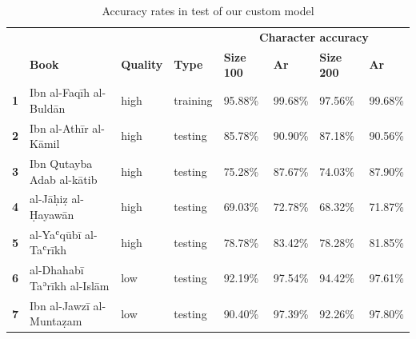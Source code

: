 \begin{table}[h!]
\begin{minipage}{\textwidth}
\begin{center}
\caption{Accuracy rates in test of our custom model}
\label{tab:soa_tab2}
\renewcommand*{\thefootnote}{\alph{footnote}}
	\begin{tabularx}{\textwidth}{lp{2.2cm}XXXXXX} \toprule
& & & & \multicolumn{4}{c}{\textbf{Character accuracy}}\\
\cline{5-8}
& \textbf{Book}\footnotemark[1] & \textbf{Quality} & \textbf{Type} & \textbf{Size 100} & \textbf{Ar}\footnotemark[2] & \textbf{Size 200} & \textbf{Ar}\footnotemark[2]\\
\midrule
\textbf{1} & Ibn al-Faqīh \newline\scriptsize{al-Buldān} & 	  high\footnotemark[3] & training & 95.88\% & 99.68\% & 97.56\% & 99.68\%\\
\textbf{2} & Ibn al-Athīr \newline\scriptsize{al-Kāmil} &  	  high\footnotemark[3] & testing & 85.78\% & 90.90\% & 87.18\% & 90.56\%\\
\textbf{3} & Ibn Qutayba \newline\scriptsize{Adab al-kātib} & high\footnotemark[3] & testing	& 75.28\% & 87.67\% & 74.03\% & 87.90\% \\
\textbf{4} & al-Jāḥiẓ \newline\scriptsize{al-Ḥayawān} & 	  high\footnotemark[3] & testing & 69.03\% & 72.78\% & 68.32\% & 71.87\%\\
\textbf{5} & al-Yaʿqūbī \newline\scriptsize{al-Taʿrīkh} & 	  high\footnotemark[3] & testing & 78.78\% & 83.42\% & 78.28\% & 81.85\%\\
\textbf{6} & al-Dhahabī \newline\scriptsize{Taʾrīkh al-Islām}  & low\footnotemark[4] & testing	& 92.19\% & 97.54\% & 94.42\% & 97.61\%\\
\textbf{7} & Ibn al-Jawzī \newline\scriptsize{al-Muntaẓam} &    low\footnotemark[4] & testing & 90.40\% & 97.39\% & 92.26\% & 97.80\%\\
\bottomrule
\end{tabularx}
\end{center}
\renewcommand\footnoterule{}
\end{minipage}
\end{table}

